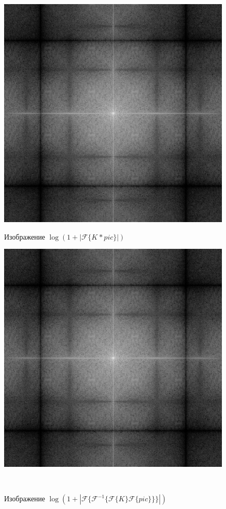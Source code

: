 \documentclass[a4paper]{article}
\begin{document}
\begin{figure}[H]
    \begin{minipage}{0.49\textwidth}
        \centering \includegraphics[width=\textwidth]{2/3_abs_fourier_log_norm_img_block.png}
        \caption{Изображение $\log{(1+|\mathcal{F}\{K_{\boxed{}}*pic\}|)}$}
    \end{minipage}\hfill
    \begin{minipage}{0.49\textwidth}
        \centering \includegraphics[width=\textwidth]{2/3_abs_fourier_log_norm_img_block1.png}
        \caption{Изображение $\log{(1+|\mathcal{F}\{\mathcal{F}^{-1}\{ \mathcal{F}\{K_{\boxed{}}\}\mathcal{F}\{pic\}\}\}|)}$}
    \end{minipage}\\[1em]
\end{figure}\noindent\
\end{document}
